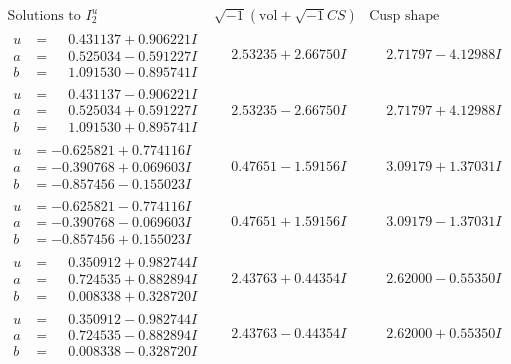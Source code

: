 \documentclass[1p]{elsarticle_modified}
\theoremstyle{definition}
\newcommand{\I}{\sqrt{-1}}
\begin{document}
$$\begin{array}{c|c|c}  
\text{Solutions to }I^u_{2}& \I (\text{vol} + \sqrt{-1}CS) & \text{Cusp shape}\\
 \hline 
\begin{aligned}
u &= \phantom{-}0.431137 + 0.906221 I \\
a &= \phantom{-}0.525034 - 0.591227 I \\
b &= \phantom{-}1.091530 - 0.895741 I\end{aligned}
 & \phantom{-}2.53235 + 2.66750 I & \phantom{-}2.71797 - 4.12988 I \\ \hline\begin{aligned}
u &= \phantom{-}0.431137 - 0.906221 I \\
a &= \phantom{-}0.525034 + 0.591227 I \\
b &= \phantom{-}1.091530 + 0.895741 I\end{aligned}
 & \phantom{-}2.53235 - 2.66750 I & \phantom{-}2.71797 + 4.12988 I \\ \hline\begin{aligned}
u &= -0.625821 + 0.774116 I \\
a &= -0.390768 + 0.069603 I \\
b &= -0.857456 - 0.155023 I\end{aligned}
 & \phantom{-}0.47651 - 1.59156 I & \phantom{-}3.09179 + 1.37031 I \\ \hline\begin{aligned}
u &= -0.625821 - 0.774116 I \\
a &= -0.390768 - 0.069603 I \\
b &= -0.857456 + 0.155023 I\end{aligned}
 & \phantom{-}0.47651 + 1.59156 I & \phantom{-}3.09179 - 1.37031 I \\ \hline\begin{aligned}
u &= \phantom{-}0.350912 + 0.982744 I \\
a &= \phantom{-}0.724535 + 0.882894 I \\
b &= \phantom{-}0.008338 + 0.328720 I\end{aligned}
 & \phantom{-}2.43763 + 0.44354 I & \phantom{-}2.62000 - 0.55350 I \\ \hline\begin{aligned}
u &= \phantom{-}0.350912 - 0.982744 I \\
a &= \phantom{-}0.724535 - 0.882894 I \\
b &= \phantom{-}0.008338 - 0.328720 I\end{aligned}
 & \phantom{-}2.43763 - 0.44354 I & \phantom{-}2.62000 + 0.55350 I \\ \hline\begin{aligned}

\end{aligned}
\end{array}$$
\end{document}
